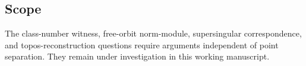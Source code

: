 \subsection{Scope}
The class-number witness, free-orbit norm-module, supersingular
correspondence, and topos-reconstruction questions require arguments
independent of point separation. They remain under investigation in
this working manuscript.
